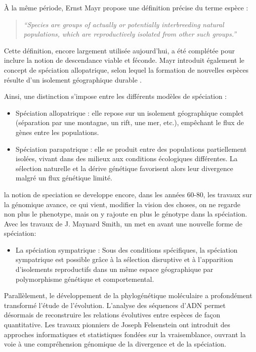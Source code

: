 \documentclass[12pt,a4paper]{article}
\begin{document}
À la même période, Ernst Mayr propose une définition précise du terme espèce :

\begin{quote}
    \textit{“Species are groups of actually or potentially interbreeding natural populations, which are reproductively isolated from other such groups.”}
\end{quote}

Cette définition, encore largement utilisée aujourd’hui, a été complétée pour inclure la notion de descendance viable et féconde.
Mayr introduit également le concept de spéciation allopatrique, selon lequel la formation de nouvelles espèces résulte d’un isolement géographique durable \parencite{mayr1942systematics}.

Ainsi, une distinction s’impose entre les différents modèles de spéciation :

\begin{itemize}
    \item Spéciation allopatrique : elle repose sur un isolement géographique complet (séparation par une montagne, un rift, une mer, etc.), empêchant le flux de gènes entre les populations.
    \item Spéciation parapatrique : elle se produit entre des populations partiellement isolées, vivant dans des milieux aux conditions écologiques différentes. La sélection naturelle et la dérive génétique favorisent alors leur divergence malgré un flux génétique limité.
\end{itemize}

la notion de speciation se developpe encore, dans les années 60-80, les travaux sur la génomique avance, ce qui vient, modifier la vision des choses, on ne regarde non plus le phenotype, mais on y rajoute en plus le génotype dans la spéciation. Avec les travaux de J. Maynard Smith, un met en avant une nouvelle forme de spéciation:
\begin{itemize}
    \item La spéciation sympatrique : Sous des conditions spécifiques, la
          spéciation sympatrique est possible grâce à la sélection disruptive et à
          l'apparition d'isolements reproductifs dans un même espace géographique par
          polymorphisme génétique et comportemental.\parencite{maynardsmith1966sympatric}
\end{itemize}

Parallèlement, le développement de la phylogénétique moléculaire a profondément transformé l’étude de l’évolution.
L’analyse des séquences d’ADN permet désormais de reconstruire les relations évolutives entre espèces de façon quantitative. Les travaux pionniers de Joseph Felsenstein \parencite{felsenstein1981evolutionary} ont introduit des approches informatiques et statistiques fondées sur la vraisemblance, ouvrant la voie à une compréhension génomique de la divergence et de la spéciation.
\end{document}
